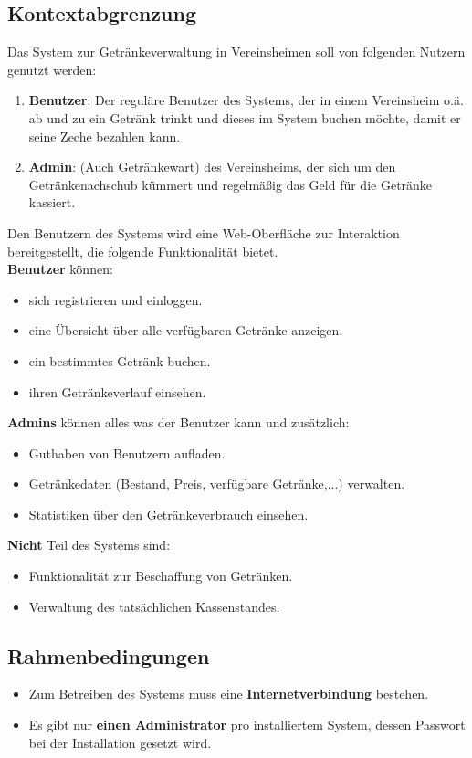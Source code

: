 \documentclass[conference,a4paper]{cs-techrep}
\begin{document}
\subsection{Kontextabgrenzung}
Das System zur Getränkeverwaltung in Vereinsheimen soll von folgenden Nutzern genutzt werden:
\begin{enumerate}
	\item \textbf{Benutzer}: 
	Der reguläre Benutzer des Systems, der in einem Vereinsheim o.ä. ab und zu ein Getränk trinkt und dieses im System buchen möchte, damit er seine Zeche bezahlen kann.
	\item \textbf{Admin}: 
	(Auch Getränkewart) des Vereinsheims, der sich um den Getränkenachschub kümmert und regelmäßig das Geld für die Getränke kassiert.
\end{enumerate}
Den Benutzern des Systems wird eine Web-Oberfläche zur Interaktion bereitgestellt, die folgende Funktionalität bietet.\\
\textbf{Benutzer} können:
\begin{itemize}
	\item sich registrieren und einloggen.
	\item eine Übersicht über alle verfügbaren Getränke anzeigen.
	\item ein bestimmtes Getränk buchen.
	\item ihren Getränkeverlauf einsehen.
\end{itemize}
\textbf{Admins} können alles was der Benutzer kann und zusätzlich:
\begin{itemize}
	\item Guthaben von Benutzern aufladen.
	\item Getränkedaten (Bestand, Preis, verfügbare Getränke,...) verwalten.
	\item Statistiken über den Getränkeverbrauch einsehen.
\end{itemize}
\textbf{Nicht} Teil des Systems sind: 
\begin{itemize}
	\item Funktionalität zur Beschaffung von Getränken.
	\item Verwaltung des tatsächlichen Kassenstandes.
\end{itemize}
\subsection{Rahmenbedingungen}
\begin{itemize}
	\item Zum Betreiben des Systems muss eine \textbf{Internetverbindung} bestehen.
	\item Es gibt nur \textbf{einen Administrator} pro installiertem System, dessen Passwort bei der Installation gesetzt wird.
\end{itemize}
\end{document}
